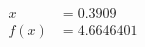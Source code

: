 \documentclass[preview]{standalone}
\begin{document}
\begin{align*}
x &= 0.3909\\f(x) &= 4.6646401
\end{align*}
\end{document}
